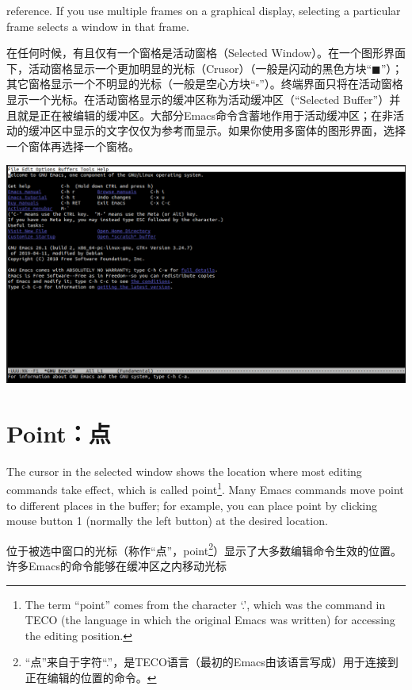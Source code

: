 reference. If you use multiple frames on a graphical display, selecting a particular frame
selects a window in that frame.\par
在任何时候，有且仅有一个窗格是活动窗格（Selected Window）。在一个图形界面下，活动窗格显示一个更加明显的光标（Crusor）（一般是闪动的黑色方块“$\blacksquare$”）；其它窗格显示一个不明显的光标（一般是空心方块“$\square$”）。终端界面只将在活动窗格显示一个光标。在活动窗格显示的缓冲区称为活动缓冲区（“Selected Buffer”）并且就是正在被编辑的缓冲区。大部分Emacs命令含蓄地作用于活动缓冲区；在非活动的缓冲区中显示的文字仅仅为参考而显示。如果你使用多窗体的图形界面，选择一个窗体再选择一个窗格。
\begin{center}
	\includegraphics[scale=0.4]{pic/Emacs-Terminal-Defaut}
\end{center}
\section{Point：点}
The cursor in the selected window shows the location where most editing commands take effect, which is called point\footnote{The term “point” comes from the character ‘.’, which was the command in TECO (the language in which the original Emacs was written) for accessing the editing position.}. Many Emacs commands move point to different places in the buffer; for example, you can place point by clicking mouse button 1 (normally the left button) at the desired location.\par
位于被选中窗口的光标（称作“点”，point\footnote{“点”来自于字符“.”，是TECO语言（最初的Emacs由该语言写成）用于连接到正在编辑的位置的命令。}）显示了大多数编辑命令生效的位置。许多Emacs的命令能够在缓冲区之内移动光标